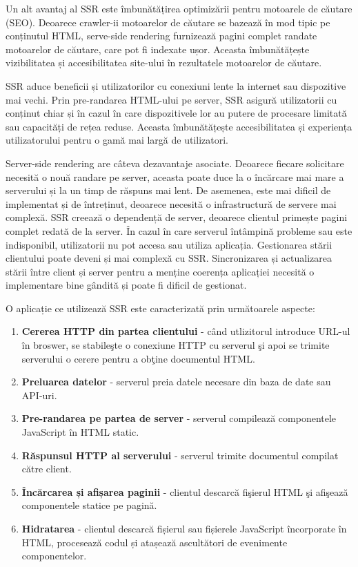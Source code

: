 \documentclass[12pt, a4paper]{report}
\begin{document}

Un alt avantaj al SSR este îmbunătățirea optimizării pentru motoarele de căutare (SEO). Deoarece crawler-ii motoarelor de căutare se bazează în mod tipic pe conținutul HTML, serve-side rendering furnizează pagini complet randate motoarelor de căutare, care pot fi indexate ușor. Aceasta îmbunătățește vizibilitatea și accesibilitatea site-ului în rezultatele motoarelor de căutare.

SSR aduce beneficii și utilizatorilor cu conexiuni lente la internet sau dispozitive mai vechi. Prin pre-randarea HTML-ului pe server, SSR asigură utilizatorii cu conținut chiar și în cazul în care dispozitivele lor au putere de procesare limitată sau capacități de rețea reduse. Aceasta îmbunătățește accesibilitatea și experiența utilizatorului pentru o gamă mai largă de utilizatori.

Server-side rendering are c\^ateva dezavantaje asociate. Deoarece fiecare solicitare necesită o nouă randare pe server, aceasta poate duce la o încărcare mai mare a serverului și la un timp de răspuns mai lent. De asemenea, este mai dificil de implementat și de întreținut, deoarece necesită o infrastructură de servere mai complexă. SSR creează o dependență de server, deoarece clientul primește pagini complet redată de la server. În cazul în care serverul întâmpină probleme sau este indisponibil, utilizatorii nu pot accesa sau utiliza aplicația.
Gestionarea stării clientului poate deveni și mai complexă cu SSR. Sincronizarea și actualizarea stării între client și server pentru a menține coerența aplicației necesită o implementare bine gândită și poate fi dificil de gestionat.

O aplicație ce utilizează SSR este caracterizat\u a prin următoarele aspecte:

\begin{enumerate}
	\item \textbf{Cererea HTTP din partea clientului} - c\^and utlizitorul introduce URL-ul \^in broswer, se stabile\c ste o conexiune HTTP cu serverul \c si apoi se trimite serverului o cerere pentru a ob\c tine documentul HTML.
	\item \textbf{Preluarea datelor} - serverul preia datele necesare din baza de date sau API-uri.
	\item \textbf{Pre-randarea pe partea de server} - serverul compileaz\u a componentele JavaScript \^in HTML static.
	\item \textbf{Răspunsul HTTP al serverului} - serverul trimite documentul compilat c\u atre client.
	\item \textbf{Încărcarea și afișarea paginii} - clientul descarc\u a fi\c sierul HTML \c si afi\c seaz\u a componentele statice pe pagină.
	\item \textbf{Hidratarea} - clientul descarcă fișierul sau fișierele JavaScript încorporate în HTML, procesează codul și atașează ascultători de evenimente componentelor.
\end{enumerate} \cite{improve-ssr-speed}
\end{document}
